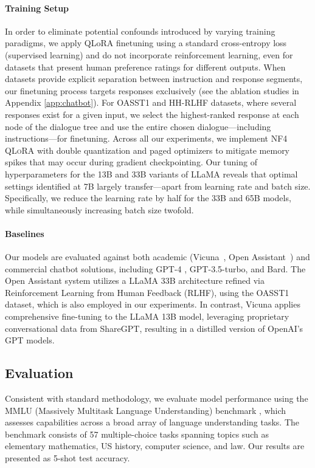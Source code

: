 \paragraph{Training Setup} In order to eliminate potential confounds introduced by varying training paradigms, we apply QLoRA finetuning using a standard cross-entropy loss (supervised learning) and do not incorporate reinforcement learning, even for datasets that present human preference ratings for different outputs. When datasets provide explicit separation between instruction and response segments, our finetuning process targets responses exclusively (see the ablation studies in Appendix \ref{app:chatbot}). For OASST1 and HH-RLHF datasets, where several responses exist for a given input, we select the highest-ranked response at each node of the dialogue tree and use the entire chosen dialogue—including instructions—for finetuning. Across all our experiments, we implement NF4 \textsc{QLoRA} with double quantization and paged optimizers to mitigate memory spikes that may occur during gradient checkpointing. Our tuning of hyperparameters for the 13B and 33B variants of LLaMA reveals that optimal settings identified at 7B largely transfer—apart from learning rate and batch size. Specifically, we reduce the learning rate by half for the 33B and 65B models, while simultaneously increasing batch size twofold.

\paragraph{Baselines} Our models are evaluated against both academic (Vicuna~\citep{vicuna2023}, Open Assistant~\citep{kopf2023openassistant}) and commercial chatbot solutions, including GPT-4 \citep{openai2023gpt}, GPT-3.5-turbo, and Bard. The Open Assistant system utilizes a LLaMA 33B architecture refined via Reinforcement Learning from Human Feedback (RLHF), using the OASST1 dataset, which is also employed in our experiments. In contrast, Vicuna applies comprehensive fine-tuning to the LLaMA 13B model, leveraging proprietary conversational data from ShareGPT, resulting in a distilled version of OpenAI’s GPT models.

\subsection{Evaluation}

Consistent with standard methodology, we evaluate model performance using the MMLU (Massively Multitask Language Understanding) benchmark \citep{hendrycksmeasuring}, which assesses capabilities across a broad array of language understanding tasks. The benchmark consists of 57 multiple-choice tasks spanning topics such as elementary mathematics, US history, computer science, and law. Our results are presented as 5-shot test accuracy.

